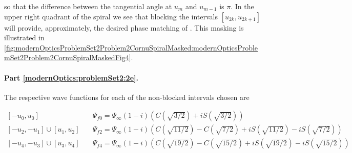 {so that the difference between the tangential angle at $u_m$ and $u_{m-1}$ is $\pi$.  In the upper right quadrant of the spiral we see that blocking the intervals $[u_{2k}, u_{2k+1}]$ will provide, approximately, the desired phase matching of .  This masking is illustrated in \cref{fig:modernOpticsProblemSet2Problem2CornuSpiralMasked:modernOpticsProblemSet2Problem2CornuSpiralMaskedFig4}.


\paragraph{Part \ref{modernOptics:problemSet2:2e}.  }

The respective wave functions for each of the non-blocked intervals chosen are

\begin{equation}\label{eqn:modernOptics:ProblemSet2:P2:180}
\begin{aligned}
[-u_0, u_0] &\quad \Psi_{f0} = \Psi_\infty (1 - i) \left( C\left(\sqrt{3/2}\right) + i S\left(\sqrt{3/2}\right) \right) \\
[-u_2, -u_1] \cup [u_1, u_2] &\quad \Psi_{f2} = \Psi_\infty (1 - i) \left( C\left(\sqrt{11/2}\right) - C\left(\sqrt{7/2}\right) + i S\left(\sqrt{11/2}\right) - iS\left(\sqrt{7/2}\right) \right) \\
[-u_4, -u_3] \cup [u_3, u_4] &\quad \Psi_{f4} = \Psi_\infty (1 - i) \left( C\left(\sqrt{19/2}\right) - C\left(\sqrt{15/2}\right) + i S\left(\sqrt{19/2}\right) - iS\left(\sqrt{15/2}\right) \right) \\
\end{aligned}
\end{equation}

}
